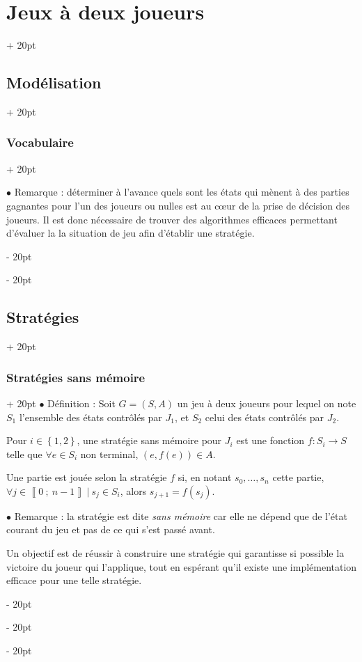 \documentclass[a4paper, 12pt, twoside]{article}
\newcommand{\nset}[2]{\left\llbracket #1\ ;\ #2 \right\rrbracket}
\newcommand{\set}[1]{\left\{ #1 \right\}}
\newcommand{\ind}[1][20pt]{\advance\leftskip + #1}
\newcommand{\deind}[1][20pt]{\advance\leftskip - #1}
\newenvironment{indt}[2][20pt]{#2 \par \ind[#1]}{\par \deind} %
\begin{document}
\begin{indt}{\section{Jeux à deux joueurs}}
\begin{indt}{\subsection{Modélisation}}
\begin{indt}{\subsubsection{Vocabulaire}}
                \vspace{12pt}
                
                $\bullet$ Remarque : déterminer à l'avance quels sont les états qui mènent à des parties gagnantes pour l'un des joueurs ou nulles est au c\oe ur de la prise de décision des joueurs. Il est donc nécessaire de trouver des algorithmes efficaces permettant d'évaluer la la situation de jeu afin d'établir une stratégie.
            \end{indt}
        \end{indt}

        \vspace{12pt}
        
        \begin{indt}{\subsection{Stratégies}}
            \begin{indt}{\subsubsection{Stratégies sans mémoire}}
                $\bullet$ Définition : Soit $G = (S, A)$ un jeu à deux joueurs pour lequel on note $S_1$ l'ensemble des états contrôlés par $J_1$, et $S_2$ celui des états contrôlés par $J_2$.

                Pour $i \in \set{1, 2}$, une stratégie sans mémoire pour $J_i$ est une fonction $f : S_i \longrightarrow S$ telle que $\forall e \in S_i$ non terminal, $(e, f(e)) \in A$.

                Une partie est jouée selon la stratégie $f$ si, en notant $s_0, \ldots, s_n$ cette partie, $\forall j \in \nset 0 {n - 1}\ |\ s_j \in S_i$, alors $s_{j + 1} = f(s_j)$.
                
                \vspace{12pt}
                
                $\bullet$ Remarque : la stratégie est dite \emph{sans mémoire} car elle ne dépend que de l'état courant du jeu et pas de ce qui s'est passé avant.

                Un objectif est de réussir à construire une stratégie qui garantisse si possible la victoire du joueur qui l'applique, tout en espérant qu'il existe une implémentation efficace pour une telle stratégie.
            \end{indt}


\end{indt}
\end{indt}
\end{document}
